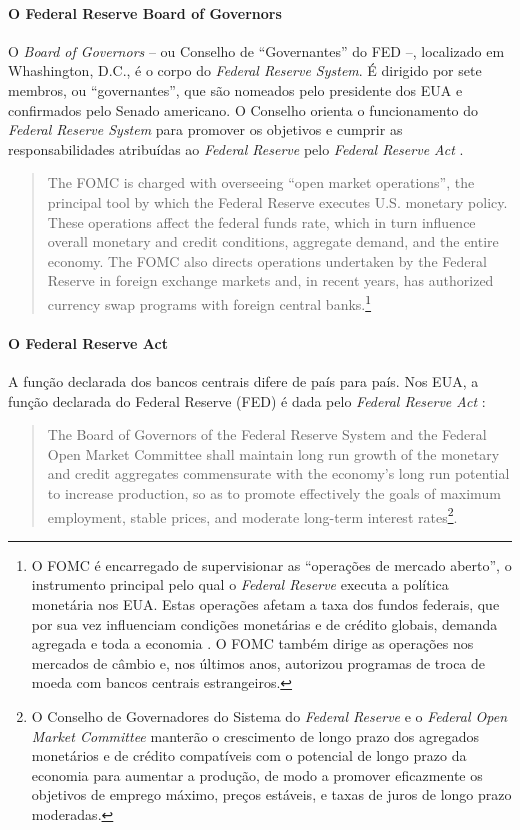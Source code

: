 \documentclass[]{article}
\let\oldparagraph\paragraph
\renewcommand{\paragraph}[1]{\oldparagraph{#1}\mbox{}}
\let\rmarkdownfootnote\footnote%
\def\footnote{\protect\rmarkdownfootnote}
\begin{document}
\paragraph{O Federal Reserve Board of
Governors}\label{o-federal-reserve-board-of-governors}

O \emph{Board of Governors} -- ou Conselho de ``Governantes'' do FED --,
localizado em Whashington, D.C., é o corpo do \emph{Federal Reserve
System}. É dirigido por sete membros, ou ``governantes'', que são
nomeados pelo presidente dos EUA e confirmados pelo Senado americano. O
Conselho orienta o funcionamento do \emph{Federal Reserve System} para
promover os objetivos e cumprir as responsabilidades atribuídas ao
\emph{Federal Reserve} pelo \emph{Federal Reserve Act} \cite{fed2}.

\begin{quote}
The FOMC is charged with overseeing ``open market operations'', the
principal tool by which the Federal Reserve executes U.S. monetary
policy. These operations affect the federal funds rate, which in turn
influence overall monetary and credit conditions, aggregate demand, and
the entire economy. The FOMC also directs operations undertaken by the
Federal Reserve in foreign exchange markets and, in recent years, has
authorized currency swap programs with foreign central banks.\footnote{O
  FOMC é encarregado de supervisionar as ``operações de mercado
  aberto'', o instrumento principal pelo qual o \emph{Federal Reserve}
  executa a política monetária nos EUA. Estas operações afetam a taxa
  dos fundos federais, que por sua vez influenciam condições monetárias
  e de crédito globais, demanda agregada e toda a economia . O FOMC
  também dirige as operações nos mercados de câmbio e, nos últimos anos,
  autorizou programas de troca de moeda com bancos centrais
  estrangeiros.}
\end{quote}

\paragraph{O Federal Reserve Act}\label{o-federal-reserve-act}

A função declarada dos bancos centrais difere de país para país. Nos
EUA, a função declarada do Federal Reserve (FED) é dada pelo
\emph{Federal Reserve Act} \cite[Title~II, Sec.~202]{publaw95-188}:

\begin{quote}
The Board of Governors of the Federal Reserve System and the Federal
Open Market Committee shall maintain long run growth of the monetary and
credit aggregates commensurate with the economy's long run potential to
increase production, so as to promote effectively the goals of maximum
employment, stable prices, and moderate long-term interest
rates\footnote{O Conselho de Governadores do Sistema do \emph{Federal
  Reserve} e o \emph{Federal Open Market Committee} manterão o
  crescimento de longo prazo dos agregados monetários e de crédito
  compatíveis com o potencial de longo prazo da economia para aumentar a
  produção, de modo a promover eficazmente os objetivos de emprego
  máximo, preços estáveis, e taxas de juros de longo prazo moderadas.}.
\end{quote}
\end{document}

